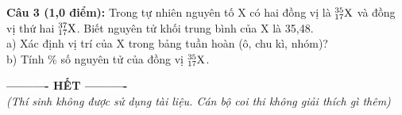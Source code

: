\documentclass[11pt,a4paper]{article}
\begin{document}
\vspace{1pt}
\noindent
{}

\vspace{4pt}
\noindent
\textbf{Câu 3 (1,0 điểm):} Trong tự nhiên nguyên tố X có hai đồng vị là $^{35}_{17}\ce{X}$ và đồng vị thứ hai $^{37}_{17}\ce{X}$. Biết nguyên tử khối trung bình của X là 35,48.\\
a) Xác định vị trí của X trong bảng tuần hoàn (ô, chu kì, nhóm)?\\
b) Tính \% số nguyên tử của đồng vị $^{35}_{17}\ce{X}$.

\vspace{1pt}
\noindent
{}

\vspace{6pt}
\begin{center}
\textbf{---------- HẾT ----------}\\
\textit{\small (Thí sinh không được sử dụng tài liệu. Cán bộ coi thi không giải thích gì thêm)}
\end{center}
\end{document}
